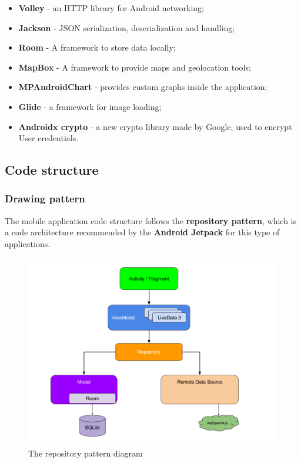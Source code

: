 \begin{itemize}
    \item \textbf{Volley} - an HTTP library for Android networking;
    \item \textbf{Jackson} - JSON serialization, deserialization and handling;
    \item \textbf{Room} - A framework to store data locally;
    \item \textbf{MapBox} - A framework to provide maps and geolocation tools;
    \item \textbf{MPAndroidChart} - provides custom graphs inside the application;
    \item \textbf{Glide} - a framework for image loading;
    \item \textbf{Androidx crypto} - a new crypto library made by Google, used to encrypt User credentials.
\end{itemize}

\subsection{Code structure}

\subsubsection{Drawing pattern}

The mobile application code structure follows the \textbf{repository pattern}, which is a code architecture recommended by the \textbf{Android Jetpack}\cite{jetpack} for this type of applications.\\

\begin{figure}[H]
    \begin{center}
        \includegraphics[scale=0.5]{_figures/repository_pattern2.png}
        \caption{The repository pattern diagram}
    \end{center}
\end{figure}

